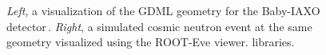 \begin{figure}[htb!]
  \centering
	\caption{\emph{Left}, a visualization of the GDML geometry for the Baby-IAXO detector\,\cite{BabyIAXO:2020mzw}. \emph{Right}, a simulated cosmic neutron event at the same geometry visualized using the ROOT-Eve viewer. libraries.}\label{fig:geant4lib}
\end{figure}

